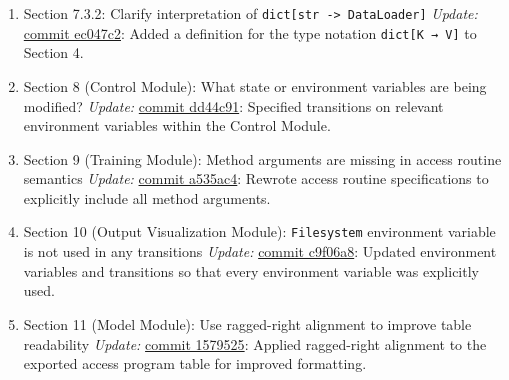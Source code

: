 \documentclass{article}
\begin{document}
\begin{enumerate}
    \item Section 7.3.2: Clarify interpretation of \texttt{dict[str -> DataLoader]}  
    \newline \textit{Update:} \href{https://github.com/Yuanqi-X/Re-ProtGNN/commit/ec047c2a088891d818541f064a51fb49df96dab8}{commit ec047c2}: Added a definition for the type notation \texttt{dict[K → V]} to Section 4.

    \item Section 8 (Control Module): What state or environment variables are being modified?  
    \newline \textit{Update:} \href{https://github.com/Yuanqi-X/Re-ProtGNN/commit/dd44c91f33f01d39f4493c1d3442a398dd9ce905}{commit dd44c91}: Specified transitions on relevant environment variables within the Control Module.

    \item Section 9 (Training Module): Method arguments are missing in access routine semantics  
    \newline \textit{Update:} \href{https://github.com/Yuanqi-X/Re-ProtGNN/commit/a535ac49f4a4f4f6d281df48b081592c544095e7}{commit a535ac4}: Rewrote access routine specifications to explicitly include all method arguments.

    \item Section 10 (Output Visualization Module): \texttt{Filesystem} environment variable is not used in any transitions  
    \newline \textit{Update:} \href{https://github.com/Yuanqi-X/Re-ProtGNN/commit/c9f06a87829ad960473694961e982bbe7a7e0fcb}{commit c9f06a8}: Updated environment variables and transitions so that every environment variable was explicitly used.

    \item Section 11 (Model Module): Use ragged-right alignment to improve table readability  
    \newline \textit{Update:} \href{https://github.com/Yuanqi-X/Re-ProtGNN/commit/1579525c0c798a68a7c23f995fa0a201d7efdc45}{commit 1579525}: Applied ragged-right alignment to the exported access program table for improved formatting.
\end{enumerate}
\end{document}
